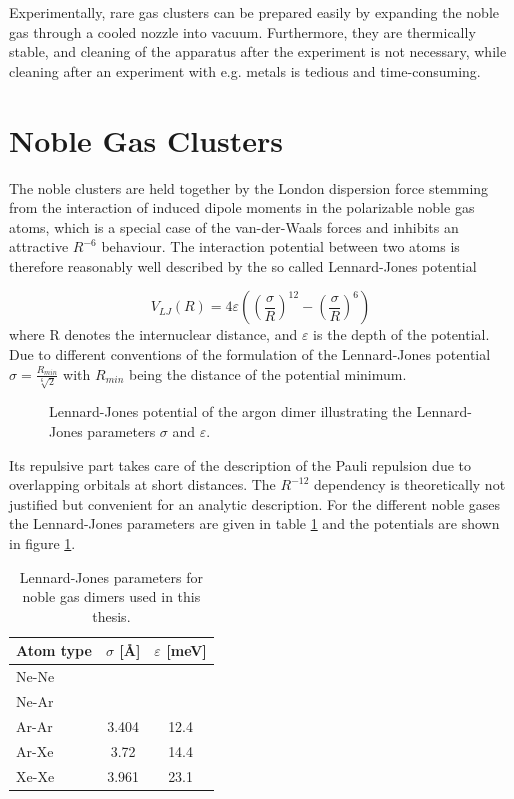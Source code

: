 Experimentally, rare gas clusters can be prepared easily by
expanding the noble gas through a cooled nozzle into vacuum. 
Furthermore, they are
thermically stable, and cleaning of the
apparatus after the experiment is not necessary, while cleaning
after an experiment with e.g. metals is tedious and time-consuming.


\section{Noble Gas Clusters}
The noble clusters are held together by the London dispersion force
stemming from the interaction of induced dipole moments in the polarizable
noble gas atoms, which is a special case of the van-der-Waals forces and
inhibits an attractive $R^{-6}$ behaviour.
The interaction potential between two atoms is therefore reasonably
well described by the so called
Lennard-Jones potential

\begin{equation}
  V_{LJ}(R) = 4 \varepsilon \left( \left(\frac{\sigma}{R}\right) ^{12}
              - \left(\frac{\sigma}{R}\right) ^{6} \right)
\end{equation}
where R denotes the internuclear distance, 
and $\varepsilon$ is the depth of the
potential. Due to different conventions of the formulation
of the Lennard-Jones potential $\sigma=\frac{R_{min}}{\sqrt[6]{2}}$
with $R_{min}$ being the distance of the potential minimum.

\begin{figure}[h]
 \centering
 
 \caption{Lennard-Jones potential of the argon dimer illustrating the
          Lennard-Jones parameters $\sigma$ and $\varepsilon$.}
 \label{figure:LJ_Ar2}
\end{figure}

Its repulsive part takes care of the description of the
Pauli repulsion due to overlapping orbitals at short distances. The
$R^{-12}$ dependency is theoretically not justified but convenient
for an analytic description.
For the different noble gases the Lennard-Jones parameters are given in
table \ref{table:LJ_parameter} and the potentials are shown in
figure \ref{figure:LJ_Ar2}.

\begin{table}[htb]
 \caption{Lennard-Jones parameters for noble gas dimers used in this
          thesis.}
 \centering
 \begin{tabular}{lcc}
   \toprule
   Atom type & $\sigma$ [\unit{\AA}] & $\varepsilon$ [\unit{meV}]\\
   \midrule
   Ne-Ne     & &\\
   Ne-Ar     &&\\
   Ar-Ar     &                 3.404 & 12.4\\
   Ar-Xe     &                 3.72  & 14.4\\
   Xe-Xe     &                 3.961 & 23.1\\
   \bottomrule
 \end{tabular}
 \label{table:LJ_parameter}
\end{table}


